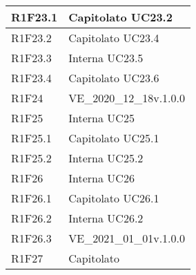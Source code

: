 \begin{center}
\begin{longtable}{|p{22mm}|p{44mm}|}
R1F23.1 &
Capitolato \newline
UC23.2 \newline
\\
\hline

R1F23.2 &
Capitolato \newline
UC23.4 \newline
\\
\hline

R1F23.3 &
Interna \newline
UC23.5 \newline
\\
\hline

R1F23.4 &
Capitolato \newline
UC23.6 \newline
\\
\hline

R1F24 &
VE\_2020\_12\_18v.1.0.0 \newline
\\
\hline

R1F25 &
Interna \newline
UC25 \newline
\\
\hline

R1F25.1 &
Capitolato \newline
UC25.1 \newline
\\
\hline

R1F25.2 &
Interna \newline
UC25.2 \newline
\\
\hline

R1F26 &
Interna \newline
UC26 \newline
\\
\hline

R1F26.1 &
Capitolato \newline
UC26.1 \newline
\\
\hline

R1F26.2 &
Interna \newline
UC26.2 \newline
\\
\hline

R1F26.3 &
VE\_2021\_01\_01v.1.0.0 \newline
\\
\hline

R1F27 &
Capitolato \newline
\\
\hline


\end{longtable}
\end{center}
